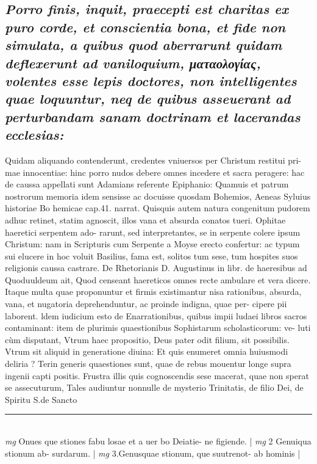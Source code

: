 \documentclass{article}
\begin{document}
\begin{pages}
\subsection*{\textit{Porro finis, inquit, praecepti est charitas ex puro corde, et conscientia bona, et fide non simulata, a quibus quod aberrarunt quidam deflexerunt ad vaniloquium, ματαολογίας, volentes esse lepis doctores, non intelligentes quae loquuntur, neq de quibus asseuerant ad perturbandam sanam doctrinam et lacerandas ecclesias: }}\pstart Quidam aliquando contenderunt, credentes vniuersos per Christum restitui pri- mae innocentiae: hinc porro nudos debere omnes incedere et sacra peragere: hac de caussa appellati sunt Adamians referente Epiphanio: Quamuis et patrum nostrorum memoria idem sensisse ac docuisse quosdam Bohemios, Aeneas Syluius historiae Bo hemicae cap.41. narrat. Quisquis autem natura congenitum pudorem adhuc retinet, statim agnoscit, illos vana et absurda conatos tueri. Ophitae haeretici serpentem ado- rarunt, sed interpretantes, se in serpente colere ipsum Christum: nam in Scripturis cum Serpente a Moyse erecto confertur: ac typum sui elucere in hoc voluit Basilius, fama est, solitos tum sese, tum hospites suos religionis caussa castrare. De Rhetorianis D. Augustinus in libr. de haeresibus ad Quoduuldeum ait, Quod censeant haereticos omnes recte ambulare et vera dicere. Itaque  multa quae proponuntur et firmis existimantur nisa rationibus, absurda, vana, et nugatoria deprehenduntur, ac proinde indigna, quae per- cipere pii laborent. ldem iudicium esto de Enarrationibus, quibus impii ludaei libros sacros contaminant: item de plurimis quaestionibus Sophistarum scholasticorum: ve- luti cùm disputant, Vtrum haec propositio, Deus pater odit filium, sit possibilis. Vtrum sit aliquid in generatione diuina: Et quis enumeret omnia huiusmodi deliria ?  \pend\pstart Terin generis quaestiones sunt, quae de rebus mouentur longe supra ingenii capti positis. Frustra illis quis cognoscendis sese macerat, quae non sperat se assecuturum, Tales audiuntur nonnulle de mysterio Trinitatis, de filio Dei, de Spiritu S.de Sancto  \pend
\vspace{0.5cm}\noindent
\vspace{0.2cm}\rule{1cm}{0.2pt}\\ 
\hspace{0.2cm}\textit{mg}
\footnotesize Onues que stiones fabu losae et a uer bo Deiatie- ne figiende. 
\normalsize| 
\hspace{0.2cm}\textit{mg}
\footnotesize 2 Genuiqua stionum ab- surdarum. 
\normalsize| 
\hspace{0.2cm}\textit{mg}
\footnotesize 3.Genusquae stionum, que suutrenot- ab hominis 
\normalsize| 

\end{pages}
\end{document}
